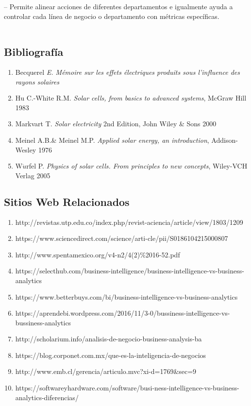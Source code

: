 \documentclass[a4paper,12pt,twocolumn]{article}
\begin{document}
– Permite alinear acciones de diferentes departamentos e igualmente ayuda a controlar cada línea de negocio o departamento con métricas específicas.\textbf{}\\
\textbf{}\\

\newpage\subsection*{Bibliografía}
\begin{enumerate}
\item Becquerel \textit{E. Mémoire sur les effets électriques produits sous l'influence des rayons solaires}  
\item Hu C.-White R.M. \textit{Solar cells, from basics to advanced systems}, McGraw Hill 1983 
\item Markvart T. \textit{Solar electricity} 2nd Edition, John Wiley \& Sons 2000
\item Meinel A.B.\& Meinel M.P. \textit{Applied solar energy, an introduction}, Addison-Wesley 1976
\item W$\ddot{u}$rfel P. \textit{Physics of solar cells. From principles to new concepts}, Wiley-VCH Verlag 2005
\end{enumerate}

\subsection*{Sitios Web Relacionados}
\begin{enumerate}
\item http://revistas.utp.edu.co/index.php/revist-aciencia/article/view/1803/1209
\item https://www.sciencedirect.com/science/arti-cle/pii/S0186104215000807
\item http://www.spentamexico.org/v4-n2/4(2)\%2016-52.pdf
\item https://selecthub.com/business-intelligence/business-intelligence-vs-business-analytics
\item https://www.betterbuys.com/bi/business-intelligence-vs-business-analytics
\item https://aprendebi.wordpress.com/2016/11/3-0/bussiness-intelligence-vs-bussiness-analytics
\item http://scholarium.info/analisis-de-negocio-business-analysis-ba
\item https://blog.corponet.com.mx/que-es-la-inteligencia-de-negocios
\item http://www.emb.cl/gerencia/articulo.mvc?xi-d=1769&sec=9
\item https://softwareyhardware.com/software/busi-ness-intelligence-vs-business-analytics-diferencias/
\end{enumerate}
\end{document}
